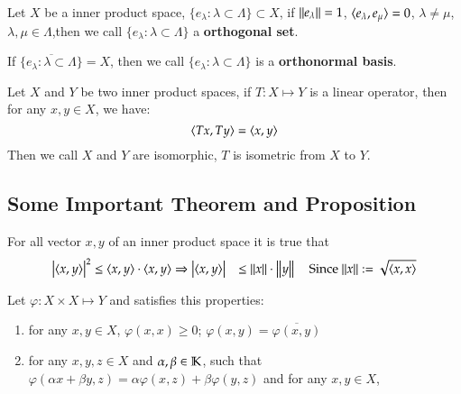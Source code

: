 \begin{definition}\label{def:3.4}
    Let $X$ be a inner product space, $\{e_{\lambda}: \lambda \subset \Lambda\} \subset X$, if $\Norm{e_{\lambda}} = 1$, $\langle e_{\lambda}, e_{\mu}\rangle = 0$, $\lambda \neq \mu$, $\lambda, \mu \in \Lambda$,then we call $\{e_{\lambda}: \lambda \subset \Lambda\}$ a \textbf{orthogonal set}.
    
    If $\overline{\{e_{\lambda}: \lambda \subset \Lambda\}} = X$, then we call $\{e_{\lambda}: \lambda \subset \Lambda\}$ is a \textbf{orthonormal basis}.
\end{definition}

\begin{definition}\label{def:3.5}
    Let $X$ and $Y$ be two inner product spaces, if $T: X \mapsto Y$ is a linear operator, then for any $x, y \in X$, we have:
    \begin{equation*}
        \langle Tx, Ty\rangle = \langle x, y\rangle
    \end{equation*}
    Then we call $X$ and $Y$ are isomorphic, $T$ is isometric from $X$ to $Y$.
\end{definition}

\subsection{Some Important Theorem and Proposition}

\begin{theorem}\label{thm:3.6}
For all vector $x, y$ of an inner product space it is true that 
\begin{equation*}
    \begin{aligned}
    \Abs{\spns{x, y}}^2 &\leq \spns{x, y} \cdot \spns{x, y}
    \Rightarrow \Abs{\spns{x, y}} &\leq \Norm{x} \cdot \Norm{y} \quad \text{Since $\Norm{x}:= \sqrt{\spns{x, x}}$}
    \end{aligned}
\end{equation*}
\end{theorem}
\begin{Remark}
Let $\varphi: X \times X \mapsto Y$ and satisfies this properties:
\begin{enumerate}[itemsep=0pt, topsep=0pt]
    \item for any $x, y \in X$, $\varphi(x, x) \geq 0$; $\varphi(x, y) = \overline{\varphi(x, y)}$
    \item for any $x, y, z \in X$ and $\alpha, \beta \in \mathbb{K}$, such that $\varphi(\alpha x + \beta y, z) = \alpha \varphi(x, z) + \beta \varphi(y, z)$ and for any $x, y \in X$, 
\end{enumerate}
\end{Remark}

